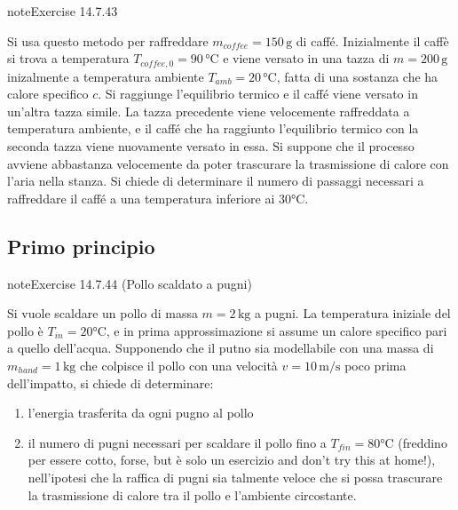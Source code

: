 \documentclass[letterpaper,10pt,italian]{jupyterBook}
\begin{document}
\begin{sphinxadmonition}{note}{Exercise 14.7.43}



\sphinxAtStartPar
Si usa questo metodo per raffreddare \(m_{coffee} = 150 \, \text{g}\) di caffé. Inizialmente il caffè si trova a temperatura \(T_{coffee,0} = 90 \, \text{°C}\) e viene versato in una tazza di \(m = 200 \, \text{g}\) inizalmente a temperatura ambiente \(T_{amb} = 20 \, \text{°C}\), fatta di una sostanza che ha calore specifico \(c\). Si raggiunge l’equilibrio termico e il caffé viene versato in un’altra tazza simile. La tazza precedente viene velocemente raffreddata a temperatura ambiente, e il caffé che ha raggiunto l’equilibrio termico con la seconda tazza viene nuovamente versato in essa. Si suppone che il processo avviene abbastanza velocemente da poter trascurare la trasmissione di calore con l’aria nella stanza. Si chiede di determinare il numero di passaggi necessari a raffreddare il caffé a una temperatura inferiore ai \(30 \text{°C}\).
\end{sphinxadmonition}


\subsection{Primo principio}
\label{\detokenize{ch/thermodynamics/principles-problems:primo-principio}} \label{exercise:ch/thermodynamics/principles-problems-exercise-43}

\begin{sphinxadmonition}{note}{Exercise 14.7.44 (Pollo scaldato a pugni)}



\sphinxAtStartPar
Si vuole scaldare un pollo di massa \(m = 2 \, \text{kg}\) a pugni. La temperatura iniziale del pollo è \(T_{in} = 20 \text{°C}\), e in prima approssimazione si assume un calore specifico pari a quello dell’acqua. Supponendo che il putno sia modellabile con una massa di \(m_{hand} = 1 \, \text{kg}\) che colpisce il pollo con una velocità \(v = 10 \, \text{m/s}\) poco prima dell’impatto, si chiede di determinare:
\begin{enumerate}
%
\item {} 
\sphinxAtStartPar
l’energia trasferita da ogni pugno al pollo

\item {} 
\sphinxAtStartPar
il numero di pugni necessari per scaldare il pollo fino a \(T_{fin} = 80 \text{°C}\) (freddino per essere cotto, forse, but è solo un esercizio and don’t try this at home!), nell’ipotesi che la raffica di pugni sia talmente veloce che si possa trascurare la trasmissione di calore tra il pollo e l’ambiente circostante.

\end{enumerate}
\end{sphinxadmonition}
 \label{exercise:ch/thermodynamics/principles-problems-exercise-44}
\end{document}
